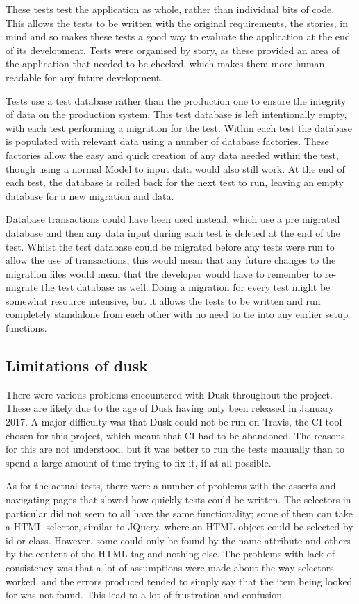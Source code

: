 These tests test the application as whole, rather than individual bits of code. This allows the tests to be written with the original requirements, the stories, in mind and so makes these tests a good way to evaluate the application at the end of its development. Tests were organised by story, as these provided an area of the application that needed to be checked, which makes them more human readable for any future development.

Tests use a test database rather than the production one to ensure the integrity of data on the production system. This test database is left intentionally empty, with each test performing a migration for the test. Within each test the database is populated with relevant data using a number of database factories. These factories allow the easy and quick creation of any data needed within the test, though using a normal Model to input data would also still work. At the end of each test, the database is rolled back for the next test to run, leaving an empty database for a new migration and data.

Database transactions could have been used instead, which use a pre migrated database and then any data input during each test is deleted at the end of the test. Whilst the test database could be migrated before any tests were run to allow the use of transactions, this would mean that any future changes to the migration files would mean that the developer would have to remember to re-migrate the test database as well. Doing a migration for every test might be somewhat resource intensive, but it allows the tests to be written and run completely standalone from each other with no need to tie into any earlier setup functions. 

\subsection{Limitations of dusk}
There were various problems encountered with Dusk throughout the project. These are likely due to the age of Dusk having only been released in January 2017. A major difficulty was that Dusk could not be run on Travis, the CI tool chosen for this project, which meant that CI had to be abandoned. The reasons for this are not understood, but it was better to run the tests manually than to spend a large amount of time trying to fix it, if at all possible.

As for the actual tests, there were a number of problems with the asserts and navigating pages that slowed how quickly tests could be written. The selectors in particular did not seem to all have the same functionality; some of them can take a HTML selector, similar to JQuery, where an HTML object could be selected by id or class. However, some could only be found by the name attribute and others by the content of the HTML tag and nothing else. The problems with lack of consistency was that a lot of assumptions were made about the way selectors worked, and the errors produced tended to simply say that the item being looked for was not found. This lead to a lot of frustration and confusion. 

